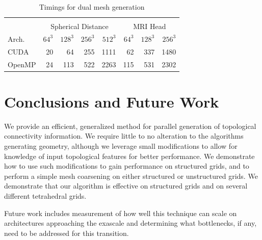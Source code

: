 \documentclass[review,journal]{vgtc}         %
\begin{document}
\begin{table}[tb!]
\begin{center}
\caption{Timings for dual mesh generation}
\label{tab:timingsdualmesh}
\begin{tabular}{l|r r r r|r r r}
\multicolumn{8}{c}{ } \\
 & \multicolumn{4}{|c|}{Spherical Distance} & \multicolumn{3}{|c}{MRI Head}\\
Arch. & $64^3$ & $128^3$ & $256^3$ & $512^3$ & $64^3$ & $128^3$ & $256^3$\\
\hline
CUDA & 20 & 64 & 255 & 1111 & 62 & 337 & 1480 \\
OpenMP & 24 & 113 & 522 & 2263 & 115 & 531 & 2302
\end{tabular}
\end{center}
\vspace{-0.6cm}
\end{table}

\section{Conclusions and Future Work}
We provide an efficient, generalized method for parallel generation of topological connectivity information. We require little to no alteration to the algorithms generating geometry, although we leverage small modifications to allow for knowledge of input topological features for better performance. We demonstrate how to use such modifications to gain performance on structured grids, and to perform a simple mesh coarsening on either structured or unstructured grids. We demonstrate that our algorithm is effective on structured grids and on several different tetrahedral grids. 

Future work includes measurement of how well this technique can scale on architectures approaching the exascale and determining what bottlenecks, if any, need to be addressed for this transition. 
 


\nocite{*}

\end{document}
